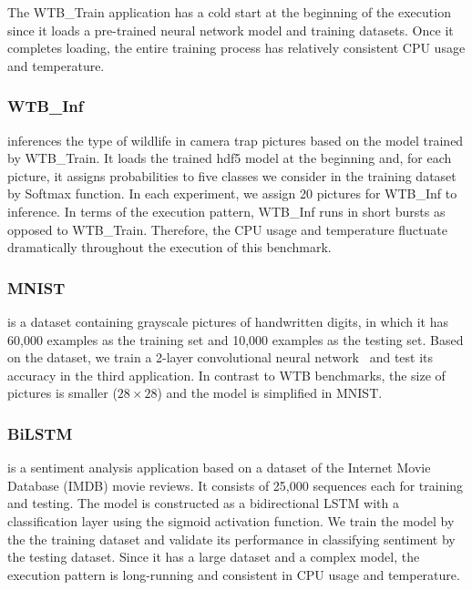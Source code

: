 The WTB\_Train application has a cold start at the beginning of the execution since it loads a pre-trained neural network model and training datasets. Once it completes loading, the entire training process has relatively consistent CPU usage and temperature. 

\subsubsection{WTB\_Inf}

inferences the type of wildlife in camera trap pictures based on the model trained by WTB\_Train. It loads the trained hdf5 model at the beginning and, for each picture, it assigns probabilities to five classes we consider in the training dataset by Softmax function. In each experiment, we assign 20 pictures for WTB\_Inf to inference. In terms of the execution pattern, WTB\_Inf runs in short bursts as opposed to WTB\_Train. Therefore, the CPU usage and temperature fluctuate dramatically throughout the execution of this benchmark.

\subsubsection{MNIST}

 is a dataset containing grayscale pictures of handwritten digits, in which it has 60,000 examples as the training set and 10,000 examples as the testing set. Based on the dataset, we train a 2-layer convolutional neural network~\cite{ref:MNIST} and test its accuracy in the third application. In contrast to WTB benchmarks, the size of pictures is smaller ($28 \times 28$) and the model is simplified in MNIST. 

\subsubsection{BiLSTM} is a sentiment analysis application based on a dataset of the Internet Movie Database (IMDB) movie reviews. It consists of 25,000 sequences each for training and testing. The model is constructed as a bidirectional LSTM with a classification layer using the sigmoid activation function. We train the model by the the training dataset and validate its performance in classifying sentiment by the testing dataset. Since it has a large dataset and a complex model, the execution pattern is long-running and consistent in CPU usage and temperature.


